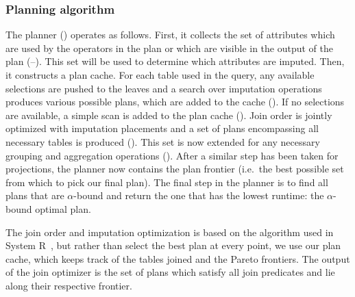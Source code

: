 \subsubsection{Planning algorithm}
The planner () operates as follows.
First, it collects the set of attributes which are used by the operators in the plan or which are visible in the output of the plan (--).
This set will be used to determine which attributes are imputed.
Then, it constructs a plan cache. For each table used in the query, any available selections are pushed to the leaves and
a search over imputation operations produces various possible plans, which are added to the cache (). If no selections are available, a 
simple scan is added to the plan cache (). Join order is jointly optimized with imputation placements and a set of
plans encompassing all necessary tables is produced (). This set is now extended for any necessary grouping and aggregation
operations (). After a similar step has been taken for projections, the planner now contains the plan frontier (i.e.\ the
best possible set from which to pick our final plan). The final step in the planner is to find all plans that are
$\alpha$-bound and return the one that has the lowest runtime: the $\alpha$-bound optimal plan.

The join order and imputation optimization is based on the algorithm used in System R~\cite{blasgen1981system},
but rather than select the best plan at every point, we use our plan cache, which keeps track of the tables joined and the Pareto frontiers.
The output of the join optimizer is the set of plans which satisfy all join predicates and lie along their respective frontier.

\begin{algorithm}

\end{algorithm}

%

